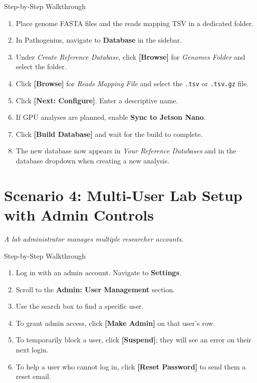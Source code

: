 \documentclass[12pt,a4paper]{report}
\newcommand{\btn}[1]{\textbf{\textcolor{primary}{[#1]}}}
\newcommand{\field}[1]{\textit{#1}}
\begin{document}
\begin{stepbox}{Step-by-Step Walkthrough}
\begin{enumerate}[leftmargin=1em, itemsep=2pt]
  \item Place genome FASTA files and the reads mapping TSV in a dedicated folder.
  \item In Pathogenius, navigate to \textbf{Database} in the sidebar.
  \item Under \textit{Create Reference Database}, click \btn{Browse} for \field{Genomes Folder} and select the folder.
  \item Click \btn{Browse} for \field{Reads Mapping File} and select the \texttt{.tsv} or \texttt{.tsv.gz} file.
  \item Click \btn{Next: Configure}. Enter a descriptive name.
  \item If GPU analyses are planned, enable \textbf{Sync to Jetson Nano}.
  \item Click \btn{Build Database} and wait for the build to complete.
  \item The new database now appears in \textit{Your Reference Databases} and in the database dropdown when creating a new analysis.
\end{enumerate}
\end{stepbox}

\section{Scenario 4: Multi-User Lab Setup with Admin Controls}

\textit{A lab administrator manages multiple researcher accounts.}

\begin{stepbox}{Step-by-Step Walkthrough}
\begin{enumerate}[leftmargin=1em, itemsep=2pt]
  \item Log in with an admin account. Navigate to \textbf{Settings}.
  \item Scroll to the \textbf{Admin: User Management} section.
  \item Use the search box to find a specific user.
  \item To grant admin access, click \btn{Make Admin} on that user's row.
  \item To temporarily block a user, click \btn{Suspend}; they will see an error on their next login.
  \item To help a user who cannot log in, click \btn{Reset Password} to send them a reset email.
\end{enumerate}
\end{stepbox}
\end{document}
